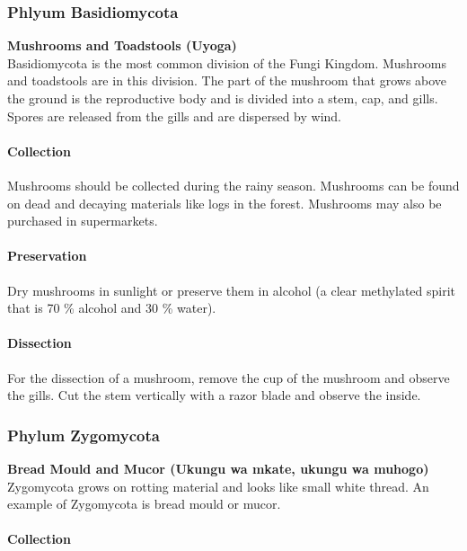 \begin{multicols}{2}

\subsubsection{Phlyum Basidiomycota}

\textbf{Mushrooms and Toadstools (Uyoga)}\\
Basidiomycota is the most common division of the Fungi Kingdom. Mushrooms and toadstools are in this division. The part of the mushroom that grows above the ground is the reproductive body and is divided into a stem, cap, and gills. Spores are released from the gills and are dispersed by wind.

\paragraph{Collection}
Mushrooms should be collected during the rainy season. Mushrooms can be found on dead and decaying materials like logs in the forest. Mushrooms may also be purchased in supermarkets.

\paragraph{Preservation} 
Dry mushrooms in sunlight or preserve them in alcohol (a clear methylated spirit that is 70 \% alcohol and 30 \% water).

\paragraph{Dissection}
For the dissection of a mushroom, remove the cup of the mushroom and observe the gills. Cut the stem vertically with a razor blade and observe the inside.

\subsubsection{Phylum Zygomycota}

\textbf{Bread Mould and Mucor (Ukungu wa mkate, ukungu wa muhogo)}\\
Zygomycota grows on rotting material and looks like small white thread. An example of Zygomycota is bread mould or mucor.

\paragraph{Collection}


\end{multicols}
